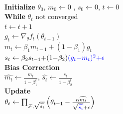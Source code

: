 \documentclass{article}
\begin{document}
\begin{minipage}{0.48\textwidth}
\begin{algorithm}[H]
\label{algo:adabelief}
 \\
\textbf{Initialize} $\theta_0$, $m_0 \leftarrow 0$ , $s_0 \leftarrow 0$, $t \leftarrow 0$ \\
\textbf{While} $\theta_t$ not converged \\
\hspace{8mm} $t \leftarrow t + 1 $ \\
\hspace{8mm} $g_t \leftarrow \nabla_{\theta}f_t(\theta_{t-1})$ \\
\hspace{8mm} $m_t \leftarrow \beta_1 m_{t-1} + (1 - \beta_1) g_t$ \\
\hspace{8mm} $s_t \leftarrow \beta_2 s_{t-1}{+}(1 {-}\beta_2){\color{blue}(g_t {-} m_t)^2 {+}\epsilon}$ \\
\hspace{8mm} \textbf{Bias Correction} \\
\hspace{16mm} $\widehat{m_t} \leftarrow \frac{m_t} {1-\beta_1^t}$,  $\widehat{s_t} \leftarrow \frac{s_t} {1-\beta_2^t}$\\
\hspace{8mm} \textbf{Update} \\
\hspace{16mm} $\theta_t \leftarrow \prod_{\mathcal{F},\sqrt{ \widehat{s_t}}} \Big( \theta_{t-1} - \frac{\alpha \widehat{m_t}} { \sqrt{{\color{blue} \widehat{s_t}}} + {\color{black} \epsilon} } \Big)$
\caption{AdaBelief Optimizer}
\end{algorithm}
\end{minipage}
\end{document}
